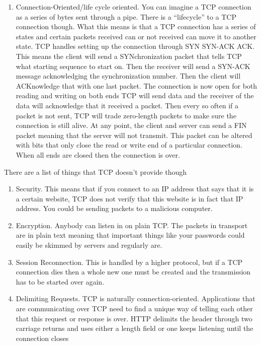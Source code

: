 \begin{enumerate}
\item Connection-Oriented/life cycle oriented.
  You can imagine a TCP connection as a series of bytes sent through a pipe.
  There is a ``lifecycle'' to a TCP connection though. What this means is that a TCP connection has a series of states and certain packets received can or not received can move it to another state.
  TCP handles setting up the connection through SYN SYN-ACK ACK. This means the client will send a SYNchronization packet that tells TCP what starting sequence to start on. Then the receiver will send a SYN-ACK message acknowledging the synchronization number.
  Then the client will ACKnowledge that with one last packet.
  The connection is now open for both reading and writing on both ends
  TCP will send data and the receiver of the data will acknowledge that it received a packet.
  Then every so often if a packet is not sent, TCP will trade zero-length packets to make sure the connection is still alive.
  At any point, the client and server can send a FIN packet meaning that the server will not transmit.
  This packet can be altered with bits that only close the read or write end of a particular connection. When all ends are closed then the connection is over.
\end{enumerate}

There are a list of things that TCP doesn't provide though

\begin{enumerate}
\item Security.
  This means that if you connect to an IP address that says that it is a certain website, TCP does not verify that this website is in fact that IP address.
  You could be sending packets to a malicious computer.
\item Encryption.
  Anybody can listen in on plain TCP.
  The packets in transport are in plain text meaning that important things like your passwords could easily be skimmed by servers and regularly are.
\item Session Reconnection.
  This is handled by a higher protocol, but if a TCP connection dies then a whole new one must be created and the transmission has to be started over again.
\item Delimiting Requests.
  TCP is naturally connection-oriented.
  Applications that are communicating over TCP need to find a unique way of telling each other that this request or response is over.
  HTTP delimits the header through two carriage returns and uses either a length field or one keeps listening until the connection closes
\end{enumerate}

